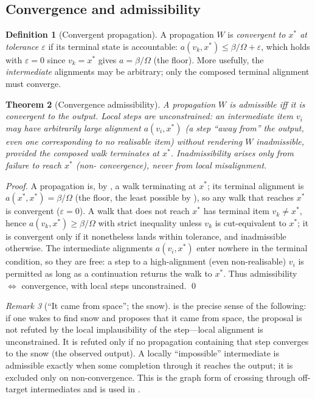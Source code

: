 \documentclass[11pt,twocolumn,a4paper]{article}
\theoremstyle{thmstyle}
\newtheorem{theorem}{Theorem}[section]
\theoremstyle{definition}
\newtheorem{definition}[theorem]{Definition}
\theoremstyle{remark}
\newtheorem{remark}[theorem]{Remark}
\newcommand{\flo}{\beta}                 %
\newcommand{\eps}{\varepsilon}
\begin{document}
\subsection{Convergence and admissibility}

\begin{definition}[Convergent propagation]
\label{def:convergent}
A propagation $W$ is \emph{convergent to $x^{\ast}$ at tolerance $\eps$} if
its terminal state is accountable: $a(v_k,x^{\ast})\le\flo/\Omega+\eps$,
which holds with $\eps=0$ since $v_k=x^{\ast}$ gives $a=\flo/\Omega$
(the floor). More usefully, the \emph{intermediate} alignments may be
arbitrary; only the composed terminal alignment must converge.
\end{definition}

\begin{theorem}[Convergence admissibility]
\label{thm:admissibility}
A propagation $W$ is \emph{admissible} iff it is convergent to the output.
Local steps are unconstrained: an intermediate item $v_i$ may have
arbitrarily large alignment $a(v_i,x^{\ast})$ (a step ``away from'' the
output, even one corresponding to no realisable item) without rendering
$W$ inadmissible, provided the composed walk terminates at $x^{\ast}$.
Inadmissibility arises only from failure to reach $x^{\ast}$ (non-%
convergence), never from local misalignment.
\end{theorem}

\begin{proof}
A propagation is, by , a walk terminating at
$x^{\ast}$; its terminal alignment is $a(x^{\ast},x^{\ast})=\flo/\Omega$
(the floor, the least possible by ), so any walk
that reaches $x^{\ast}$ is convergent ($\eps=0$). A walk that does not
reach $x^{\ast}$ has terminal item $v_k\neq x^{\ast}$, hence
$a(v_k,x^{\ast})\ge\flo/\Omega$ with strict inequality unless $v_k$ is
cut-equivalent to $x^{\ast}$; it is convergent only if it nonetheless lands
within tolerance, and inadmissible otherwise. The intermediate alignments
$a(v_i,x^{\ast})$ enter nowhere in the terminal condition, so they are
free: a step to a high-alignment (even non-realisable) $v_i$ is permitted
as long as a continuation returns the walk to $x^{\ast}$. Thus
admissibility $\iff$ convergence, with local steps unconstrained. \qed
\end{proof}

\begin{remark}[``It came from space''; the snow]
\label{rem:snow}
 is the precise sense of the following: if one
wakes to find snow and proposes that it came from space, the proposal is
not refuted by the local implausibility of the step---local alignment is
unconstrained. It is refuted only if no propagation containing that step
converges to the snow (the observed output). A locally ``impossible''
intermediate is admissible exactly when some completion through it reaches
the output; it is excluded only on non-convergence. This is the graph form
of crossing through off-target intermediates and is used in
.
\end{remark}
\end{document}
